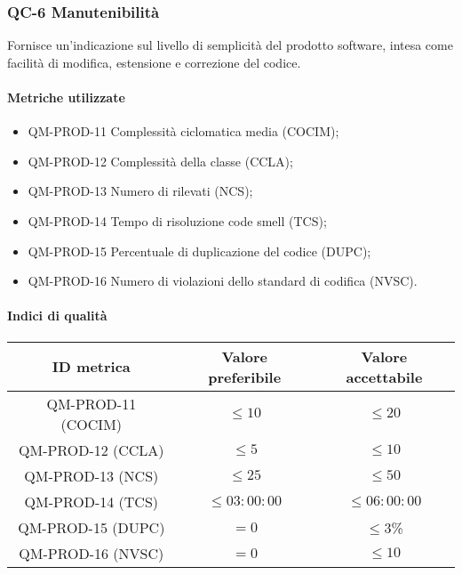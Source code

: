\subsubsection{QC-6 Manutenibilità}
Fornisce un'indicazione sul livello di semplicità del prodotto software, intesa come facilità di modifica, estensione e correzione del codice.

	\paragraph{Metriche utilizzate}
	\begin{itemize}
		\item QM-PROD-11 Complessità ciclomatica media (COCIM);
		\item QM-PROD-12 Complessità della classe (CCLA);
		\item QM-PROD-13 Numero di  rilevati (NCS);
		\item QM-PROD-14 Tempo di risoluzione code smell (TCS);
		\item QM-PROD-15 Percentuale di duplicazione del codice (DUPC);
		\item QM-PROD-16 Numero di violazioni dello standard di codifica (NVSC).
	\end{itemize}

	\paragraph{Indici di qualità}
	\begin{center}
		\begin{tabular}{|c|c|c|}
			\rowcolor{lighter-grayer}
			\hline
			\textbf{ID metrica} & \textbf{Valore preferibile} & \textbf{Valore accettabile} \\
			\hline
			QM-PROD-11 (COCIM) & \(\le 10\) & \(\le 20\) \\
			\hline
			QM-PROD-12 (CCLA) & \(\le 5\) & \(\le 10\) \\
			\hline
			QM-PROD-13 (NCS) & \(\le 25\) & \(\le 50\) \\
			\hline
			QM-PROD-14 (TCS) & \(\le 03:00:00\) & \(\le 06:00:00\) \\
			\hline
			QM-PROD-15 (DUPC) & \(= 0\) & \(\le 3\)\% \\
			\hline
			QM-PROD-16 (NVSC) & \(= 0\) & \(\le 10\) \\
			\hline
		\end{tabular}
	\end{center}
